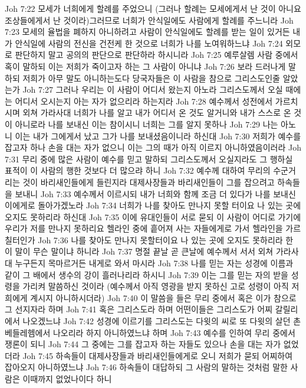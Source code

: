 Joh 7:22  모세가 너희에게 할례를 주었으니 (그러나 할례는 모세에게서 난 것이 아니요 조상들에게서 난 것이라)그러므로 너희가 안식일에도 사람에게 할례를 주느니라
Joh 7:23  모세의 율법을 폐하지 아니하려고 사람이 안식일에도 할례를 받는 일이 있거든 내가 안식일에 사람의 전신을 건전케 한 것으로 너희가 나를 노여워하느냐
Joh 7:24  외모로 판단하지 말고 공의의 판단으로 판단하라 하시니라
Joh 7:25  예루살렘 사람 중에서 혹이 말하되 이는 저희가 죽이고자 하는 그 사람이 아니냐
Joh 7:26  보라 드러나게 말하되 저희가 아무 말도 아니하는도다 당국자들은 이 사람을 참으로 그리스도인줄 알았는가
Joh 7:27  그러나 우리는 이 사람이 어디서 왔는지 아노라 그리스도께서 오실 때에는 어디서 오시는지 아는 자가 없으리라 하는지라
Joh 7:28  예수께서 성전에서 가르치시며 외쳐 가라사대 너희가 나를 알고 내가 어디서 온 것도 알거니와 내가 스스로 온 것이 아니로라 나를 보내신 이는 참이시니 너희는 그를 알지 못하나
Joh 7:29  나는 아노니 이는 내가 그에게서 났고 그가 나를 보내셨음이니라 하신대
Joh 7:30  저희가 예수를 잡고자 하나 손을 대는 자가 없으니 이는 그의 때가 아직 이르지 아니하였음이러라
Joh 7:31  무리 중에 많은 사람이 예수를 믿고 말하되 그리스도께서 오실지라도 그 행하실 표적이 이 사람의 행한 것보다 더 많으랴 하니
Joh 7:32  예수께 대하여 무리의 수군거리는 것이 바리새인들에게 들린지라 대제사장들과 바리새인들이 그를 잡으려고 하속들을 보내니
Joh 7:33  예수께서 이르시되 내가 너희와 함께 조금 더 있다가 나를 보내신 이에게로 돌아가겠노라
Joh 7:34  너희가 나를 찾아도 만나지 못할 터이요 나 있는 곳에 오지도 못하리라 하신대
Joh 7:35  이에 유대인들이 서로 묻되 이 사람이 어디로 가기에 우리가 저를 만나지 못하리요 헬라인 중에 흩어져 사는 자들에게로 가서 헬라인을 가르칠터인가
Joh 7:36  나를 찾아도 만나지 못할터이요 나 있는 곳에 오지도 못하리라 한 이 말이 무슨 말이냐 하니라
Joh 7:37  명절 끝날 곧 큰날에 예수께서 서서 외쳐 가라사대 누구든지 목마르거든 내게로 와서 마시라
Joh 7:38  나를 믿는 자는 성경에 이름과 같이 그 배에서 생수의 강이 흘러나리라 하시니
Joh 7:39  이는 그를 믿는 자의 받을 성령을 가리켜 말씀하신 것이라 (예수께서 아직 영광을 받지 못하신 고로 성령이 아직 저희에게 계시지 아니하시더라)
Joh 7:40  이 말씀을 들은 무리 중에서 혹은 이가 참으로 그 선지자라 하며
Joh 7:41  혹은 그리스도라 하며 어떤이들은 그리스도가 어찌 갈릴리에서 나오겠느냐
Joh 7:42  성경에 이르기를 그리스도는 다윗의 씨로 또 다윗의 살던 촌 베들레헴에서 나오리라 하지 아니하였느냐 하며
Joh 7:43  예수를 인하여 무리 중에서 쟁론이 되니
Joh 7:44  그 중에는 그를 잡고자 하는 자들도 있으나 손을 대는 자가 없었더라
Joh 7:45  하속들이 대제사장들과 바리새인들에게로 오니 저희가 묻되 어찌하여 잡아오지 아니하였느냐
Joh 7:46  하속들이 대답하되 그 사람의 말하는 것처럼 말한 사람은 이때까지 없었나이다 하니
